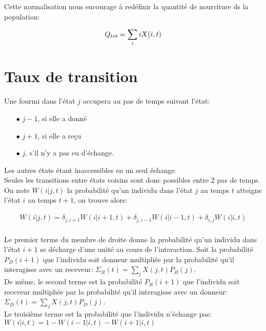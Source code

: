 Cette normalisation nous encourage à redéfinir la quantité de nourriture ds la population:

\begin{equation}
Q_{tot}= \sum_i i X(i,t)\\
\end{equation}

\section{Taux de transition}
Une fourmi dans l'état $j$ occupera au pas de temps suivant l'état:
\begin{itemize}
\item[$\bullet$] $j-1$, si elle a donné
\item[$\bullet$] $j+1$, si elle a reçu
\item[$\bullet$] $j$, s'il n'y a pas eu d'échange.
\end{itemize}
Les autres états étant inaccessibles en un seul échange.\\

Seules les transitions entre états voisins sont donc possibles entre 2 pas de temps. On note $W(i|j,t)$ la probabilité qu'un individu dans l'état $j$ au temps $t$ atteigne l'état $i$ au temps $t+1$, on trouve alors:


\begin{equation}
\begin{aligned}
W(i|j,t) = \delta_{j,i+1} W(i|i+1,t) + \delta_{j,i-1} W(i|i-1,t) + \delta_{i,j} W(i|i,t)\\
\label{Wij}
\end{aligned}
\end{equation}


Le premier terme du membre de droite donne la probabilité qu'un individu dans l'état $i+1$ se décharge d'une unité au cours de l'interaction. Soit la probabilité $P_D(i+1)$ que l'individu soit donneur multipliée par la probabilité qu'il interagisse avec un receveur: $\Sigma_R(t) = \sum_j X(j,t) P_R(j)$.\\
De même, le second terme est la probabilité $P_R(i+1)$ que l'individu soit receveur multipliée par la probabilité qu'il interagisse avec un donneur: $\Sigma_D(t) = \sum_j X(j,t) P_D(j)$.\\
Le troisième terme est la probabilité que l'individu n'échange pas: $W(i|i,t) = 1 - W(i-1|i,t)- W(i+1|i,t)$\\


